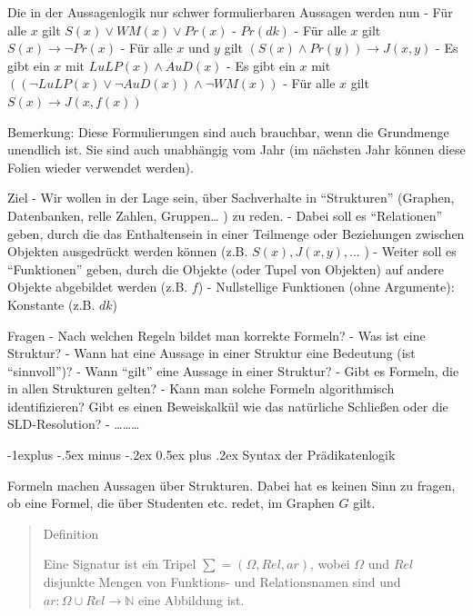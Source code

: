 \documentclass[a4paper]{article}
\makeatletter
\renewcommand{\subsection}{\@startsection{subsection}{2}{0mm}%
                {-1explus -.5ex minus -.2ex}%
                {0.5ex plus .2ex}%
                {\normalfont\normalsize\bfseries}}
\makeatother
\begin{document}
\begin{multicols}{3}
  Die in der Aussagenlogik nur schwer formulierbaren Aussagen werden nun -
  Für alle $x$ gilt $S(x)\vee WM(x)\vee Pr(x)$ - $Pr(dk)$ - Für alle $x$
  gilt $S(x)\rightarrow\lnot Pr(x)$ - Für alle $x$ und $y$ gilt
  $(S(x)\wedge Pr(y))\rightarrow J(x,y)$ - Es gibt ein $x$ mit
  $LuLP(x)\wedge AuD(x)$ - Es gibt ein $x$ mit
  $((\lnot LuLP(x)\vee\lnot AuD(x))\wedge\lnot WM(x))$ - Für alle $x$ gilt
  $S(x)\rightarrow J(x,f(x))$

  Bemerkung: Diese Formulierungen sind auch brauchbar, wenn die Grundmenge
  unendlich ist. Sie sind auch unabhängig vom Jahr (im nächsten Jahr
  können diese Folien wieder verwendet werden).

  Ziel - Wir wollen in der Lage sein, über Sachverhalte in ``Strukturen''
  (Graphen, Datenbanken, relle Zahlen, Gruppen\ldots{} ) zu reden. - Dabei
  soll es ``Relationen'' geben, durch die das Enthaltensein in einer
  Teilmenge oder Beziehungen zwischen Objekten ausgedrückt werden können
  (z.B. $S(x),J(x,y),...$ ) - Weiter soll es ``Funktionen'' geben, durch
  die Objekte (oder Tupel von Objekten) auf andere Objekte abgebildet
  werden (z.B. $f$) - Nullstellige Funktionen (ohne Argumente): Konstante
  (z.B. $dk$)

  Fragen - Nach welchen Regeln bildet man korrekte Formeln? - Was ist eine
  Struktur? - Wann hat eine Aussage in einer Struktur eine Bedeutung (ist
  ``sinnvoll'')? - Wann ``gilt'' eine Aussage in einer Struktur? - Gibt es
  Formeln, die in allen Strukturen gelten? - Kann man solche Formeln
  algorithmisch identifizieren? Gibt es einen Beweiskalkül wie das
  natürliche Schließen oder die SLD-Resolution? - \ldots{}\ldots{}\ldots{}

  \subsection{Syntax der
    Prädikatenlogik}\label{syntax-der-pruxe4dikatenlogik}

  Formeln machen Aussagen über Strukturen. Dabei hat es keinen Sinn zu
  fragen, ob eine Formel, die über Studenten etc. redet, im Graphen $G$
  gilt.

  \begin{quote}
    Definition

    Eine Signatur ist ein Tripel $\sum=(\Omega, Rel,ar)$, wobei $\Omega$ und
    $Rel$ disjunkte Mengen von Funktions- und Relationsnamen sind und
    $ar:\Omega\cup Rel\rightarrow\mathbb{N}$ eine Abbildung ist.
  \end{quote}


\end{multicols}
\end{document}
